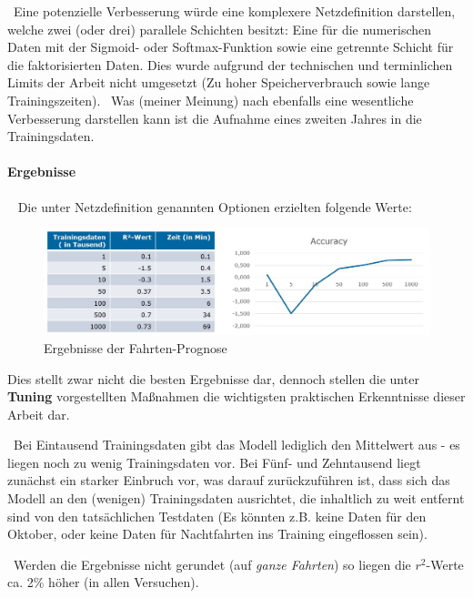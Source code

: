 ~\newline Eine potenzielle Verbesserung würde eine komplexere Netzdefinition darstellen, welche zwei (oder drei) parallele Schichten besitzt: Eine für die numerischen Daten mit der Sigmoid- oder Softmax-Funktion sowie eine getrennte Schicht für die faktorisierten Daten. Dies wurde aufgrund der technischen und terminlichen Limits der Arbeit nicht umgesetzt (Zu hoher Speicherverbrauch sowie lange Trainingszeiten). 
~\newline Was (meiner Meinung) nach ebenfalls eine wesentliche Verbesserung darstellen kann ist die Aufnahme eines zweiten Jahres in die Trainingsdaten.
\paragraph{Ergebnisse} ~\newline
Die unter Netzdefinition genannten Optionen erzielten folgende Werte:

\begin{figure}[h]
	\begin{center}
		\includegraphics[width=0.95\linewidth]{Bilder/FahrtenErgebnisse}
		\caption[Ergebnisse der Trinkgeldprognose]{Ergebnisse der Fahrten-Prognose}
		\label{fig:RidesErg}
	\end{center}
\end{figure}

Dies stellt zwar nicht die besten Ergebnisse dar, dennoch stellen die unter \textbf{Tuning} vorgestellten Maßnahmen die wichtigsten praktischen Erkenntnisse dieser Arbeit dar. 

~\newline Bei Eintausend Trainingsdaten gibt das Modell lediglich den Mittelwert aus - es liegen noch zu wenig Trainingsdaten vor. Bei Fünf- und Zehntausend liegt zunächst ein starker Einbruch vor, was darauf zurückzuführen ist, dass sich das Modell an den (wenigen) Trainingsdaten ausrichtet, die inhaltlich zu weit entfernt sind von den tatsächlichen Testdaten (Es könnten z.B. keine Daten für den Oktober, oder keine Daten für Nachtfahrten ins Training eingeflossen sein).

~\newline Werden die Ergebnisse nicht gerundet (auf \textit{ganze Fahrten}) so liegen die $r^2$-Werte ca. 2\% höher (in allen Versuchen).
\newpage
